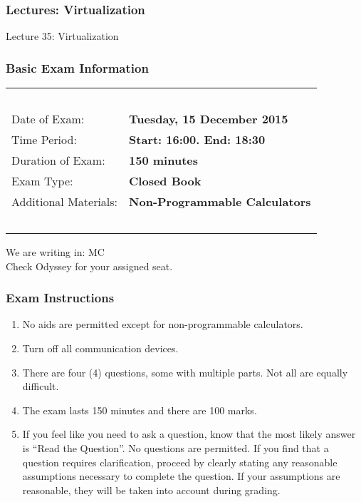 \begin{frame}
\frametitle{Lectures: Virtualization}

{\LARGE
Lecture 35: Virtualization
}

\end{frame}

\begin{frame}
\frametitle{Basic Exam Information}

\begin{table}[h]
 \begin{tabular}{|l l|}
        	\hline
			~ & ~ \\	
			Date of Exam: & \textbf{Tuesday, 15 December 2015} \\
			Time Period: & \textbf{Start: 16:00. End: 18:30}\\
			Duration of Exam: & \textbf{150 minutes}\\
			Exam Type: & \textbf{Closed Book}\\
			Additional Materials: & \textbf{Non-Programmable Calculators}\\
			~ & ~\\
			\hline
          \end{tabular}
\end{table}

We are writing in: MC\\
Check Odyssey for your assigned seat.

\end{frame}

\begin{frame}
\frametitle{Exam Instructions}

\begin{enumerate}
	\item No aids are permitted except for non-programmable calculators.
	\item Turn off all communication devices.
	\item There are four (4) questions, some with multiple parts. Not all are equally difficult.
	\item The exam lasts 150 minutes and there are 100 marks.
	\item If you feel like you need to ask a question, know that the most likely answer is ``Read the Question''. No questions are permitted. If you find that a question requires clarification, proceed by clearly stating any reasonable assumptions necessary to complete the question. If your assumptions are reasonable, they will be taken into account during grading. 
\end{enumerate}

\end{frame}

